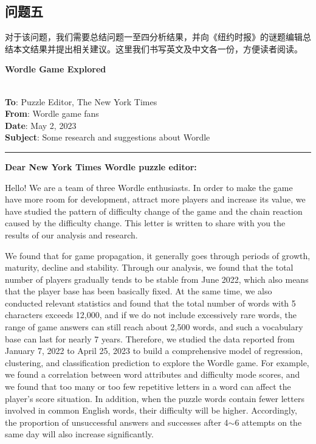 \documentclass{MathModeling}
\begin{document}
	\subsection{问题五}
	对于该问题，我们需要总结问题一至四分析结果，并向《纽约时报》的谜题编辑总结本文结果并提出相关建议。这里我们书写英文及中文各一份，方便读者阅读。
	\newpage
	\centerline{{\Large \textbf{Wordle Game Explored}}}\label{问题五}
	~\\
	\noindent \textbf{To}: Puzzle Editor, The New York Times\\
	\noindent \textbf{From}: Wordle game fans\\
	\noindent \textbf{Date}: May 2, 2023\\
	\noindent \textbf{Subject}: Some research and suggestions about Wordle\\
	\noindent\rule{\textwidth}{1.2pt}
	\textbf{Dear New York Times Wordle puzzle editor:}

	Hello! We are a team of three Wordle enthusiasts. In order to make the game have more room for development, attract more players and increase its value, we have studied the pattern of difficulty change of the game and the chain reaction caused by the difficulty change. This letter is written to share with you the results of our analysis and research.

	We found that for game propagation, it generally goes through periods of growth, maturity, decline and stability. Through our analysis, we found that the total number of players gradually tends to be stable from June 2022, which also means that the player base has been basically fixed. At the same time, we also conducted relevant statistics and found that the total number of words with 5 characters exceeds 12,000, and if we do not include excessively rare words, the range of game answers can still reach about 2,500 words, and such a vocabulary base can last for nearly 7 years. Therefore, we studied the data reported from January 7, 2022 to April 25, 2023 to build a comprehensive model of regression, clustering, and classification prediction to explore the Wordle game. For example, we found a correlation between word attributes and difficulty mode scores, and we found that too many or too few repetitive letters in a word can affect the player's score situation. In addition, when the puzzle words contain fewer letters involved in common English words, their difficulty will be higher. Accordingly, the proportion of unsuccessful answers and successes after 4$\sim$6 attempts on the same day will also increase significantly.
\end{document}
